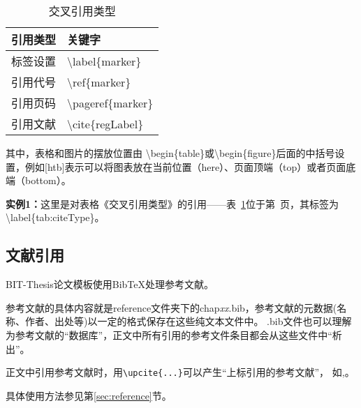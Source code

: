 \begin{table}[htb]
 \centering
  \caption{交叉引用类型}       %
  \label{tab:citeType}    %
  \begin{tabular}{cl}
    \hline
    引用类型     & 关键字     \\
    \hline
    标签设置        & \textbackslash label\{marker\}  \\
    引用代号        & \textbackslash ref\{marker\}    \\
    引用页码        & \textbackslash pageref\{marker\} \\
    引用文献        & \textbackslash cite\{regLabel\} \\
    \hline
  \end{tabular}
\end{table}

其中，表格和图片的摆放位置由 \textbackslash begin\{table\}或\textbackslash begin\{figure\}后面的中括号设置，例如[htb]表示可以将图表放在当前位置（here）、页面顶端（top）或者页面底端（bottom）。

{\bf{实例1：}}这里是对表格《交叉引用类型》的引用——表~\ref{tab:citeType}位于第~\pageref{tab:citeType}页，其标签为\textbackslash label\{tab:citeType\}。


\subsection{文献引用}
\label{sec:citeRefs}

BIT-Thesis论文模板使用BibTeX处理参考文献。

参考文献的具体内容就是reference文件夹下的chap\textit{xx}.bib，参考文献的元数据(名称、作者、出处等)以一定的格式保存在这些纯文本文件中。
.bib文件也可以理解为参考文献的``数据库''，正文中所有引用的参考文件条目都会从这些文件中``析出''。

正文中引用参考文献时，用\verb+\upcite{...}+可以产生“上标引用的参考文献”，
如,。

具体使用方法参见第\ref{sec:reference}节。
